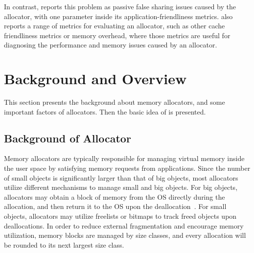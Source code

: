 In contrast, \MP{} reports this problem as passive false sharing issues caused by the allocator, with one parameter inside its application-friendliness metrics. \MP{} also reports a range of metrics for evaluating an allocator, such as other cache friendliness metrics or memory overhead, where those metrics are useful for diagnosing the performance and memory issues caused by an allocator.     

\section{Background and Overview}
\label{sec:background}

This section presents the background about memory allocators, and some important factors of allocators. Then the basic idea of \MP{} is presented. 

\subsection{Background of Allocator}

\label{sec:allocator}
Memory allocators are typically responsible for managing virtual memory inside the user space by satisfying memory requests from applications. Since the number of small objects is significantly larger than that of big objects, most allocators utilize different mechanisms to manage small and big objects. For big objects, allocators may obtain a block of memory from the OS directly during the allocation, and then return it to the OS upon the deallocation~\citep{Hoard}. For small objects, allocators may utilize freelists or bitmaps to track freed objects upon deallocations. In order to reduce external fragmentation and encourage memory utilization, memory blocks are managed by size classes, and every allocation will be rounded to its next largest size class.  

